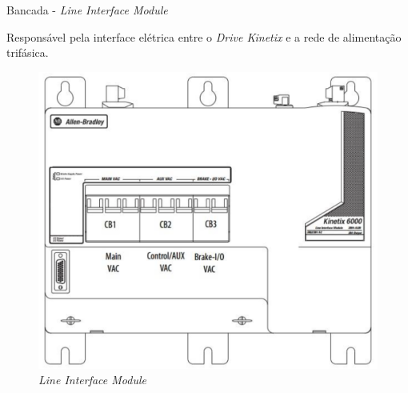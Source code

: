 \documentclass[10pt]{beamer}
\begin{document}
\begin{frame}[fragile]{Bancada - \textit{Line Interface Module}}
\begin{block}{}
Responsável pela interface elétrica entre o \textit{Drive Kinetix} e a rede de alimentação trifásica.
\end{block}

\begin{figure}[!ht]
	\centering
	\includegraphics[width=.5\linewidth]{figures/fundamentos/LineInterfaceModule}
	\caption{\textit{Line Interface Module} \cite{redytton}}
	\label{bancadalim}
\end{figure}

\end{frame}
\end{document}
